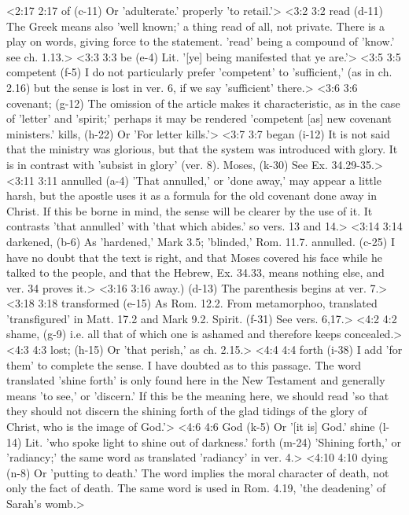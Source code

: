 <2:17 2:17  of (c-11)  Or 'adulterate.' properly 'to retail.'>
<3:2 3:2  read (d-11)  The Greek means also 'well known;' a thing read of all, not  private. There is a play on words, giving force to the  statement. 'read' being a compound of 'know.' see ch. 1.13.>
<3:3 3:3  be (e-4)  Lit. '[ye] being manifested that ye are.'>
<3:5 3:5  competent (f-5)  I do not particularly prefer 'competent' to 'sufficient,' (as  in ch. 2.16) but the sense is lost in ver. 6, if we say  'sufficient' there.>
<3:6 3:6  covenant; (g-12)  The omission of the article makes it characteristic, as in  the case of 'letter' and 'spirit;' perhaps it may be rendered  'competent [as] new covenant ministers.'
  kills, (h-22)  Or 'For letter kills.'>
<3:7 3:7  began (i-12)  It is not said that the ministry was glorious, but that the  system was introduced with glory. It is in contrast with  'subsist in glory' (ver. 8).
  Moses, (k-30)  See Ex. 34.29-35.>
<3:11 3:11  annulled (a-4)  'That annulled,' or 'done away,' may appear a little harsh,  but the apostle uses it as a formula for the old covenant done  away in Christ. If this be borne in mind, the sense will be  clearer by the use of it. It contrasts 'that annulled' with  'that which abides.' so vers. 13 and 14.>
<3:14 3:14  darkened, (b-6)  As 'hardened,' Mark 3.5; 'blinded,' Rom. 11.7.
  annulled. (c-25)  I have no doubt that the text is right, and that Moses  covered his face while he talked to the people, and that the  Hebrew, Ex. 34.33, means nothing else, and ver. 34 proves it.>
<3:16 3:16  away.) (d-13)  The parenthesis begins at ver. 7.>
<3:18 3:18  transformed (e-15)  As Rom. 12.2. From metamorphoo, translated 'transfigured'  in Matt. 17.2 and Mark 9.2.
  Spirit. (f-31)  See vers. 6,17.>
<4:2 4:2  shame, (g-9)  i.e. all that of which one is ashamed and therefore keeps  concealed.>
<4:3 4:3  lost; (h-15)  Or 'that perish,' as ch. 2.15.>
<4:4 4:4  forth (i-38)  I add 'for them' to complete the sense. I have doubted as to  this passage. The word translated 'shine forth' is only found  here in the New Testament and generally means 'to see,' or  'discern.' If this be the meaning here, we should read 'so that  they should not discern the shining forth of the glad tidings  of the glory of Christ, who is the image of God.'>
<4:6 4:6  God (k-5)  Or '[it is] God.'
  shine (l-14)  Lit. 'who spoke light to shine out of darkness.'
  forth (m-24)  'Shining forth,' or 'radiancy;' the same word as translated  'radiancy' in ver. 4.>
<4:10 4:10  dying (n-8)  Or 'putting to death.' The word implies the moral character  of death, not only the fact of death. The same word is used in  Rom. 4.19, 'the deadening' of Sarah's womb.>
